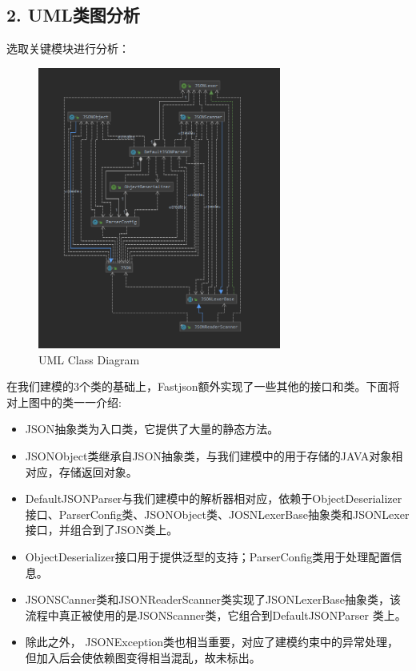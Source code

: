 \documentclass{article}
\begin{document}
\subsection*{2. UML类图分析}
选取关键模块进行分析：
\begin{figure}[H]
\centering %
\includegraphics[width = 8cm]{pic13.png}
\caption{UML Class Diagram}
\end{figure}
在我们建模的3个类的基础上，Fastjson额外实现了一些其他的接口和类。下面将对上图中的类一一介绍:
\begin{itemize}
\item JSON抽象类为入口类，它提供了大量的静态方法。
\item JSONObject类继承自JSON抽象类，与我们建模中的用于存储的JAVA对象相对应，存储返回对象。
\item DefaultJSONParser与我们建模中的解析器相对应，依赖于ObjectDeserializer接口、ParserConfig类、JSONObject类、JOSNLexerBase抽象类和JSONLexer接口，并组合到了JSON类上。
\item ObjectDeserializer接口用于提供泛型的支持；ParserConfig类用于处理配置信息。
\item JSONSCanner类和JSONReaderScanner类实现了JSONLexerBase抽象类，该流程中真正被使用的是JSONScanner类，它组合到DefaultJSONParser 类上。
\item 除此之外， JSONException类也相当重要，对应了建模约束中的异常处理，但加入后会使依赖图变得相当混乱，故未标出。
\end{itemize}
\end{document}
